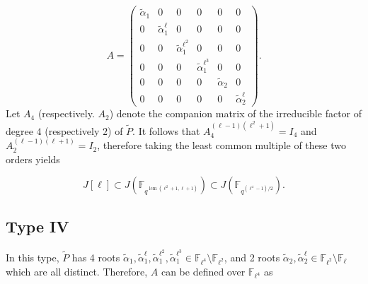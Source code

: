 \documentclass[11pt,a4paper]{article}
\theoremstyle{plain}
\theoremstyle{definition}
\theoremstyle{remark}
\DeclareMathOperator{\lcm}{lcm}
\begin{document}
\[
A =
\begin{pmatrix}
\tilde{\alpha}_1 & 0 & 0 & 0 & 0 & 0\\
0 & \tilde{\alpha}_1^\ell & 0 & 0 & 0 & 0\\
0 & 0 & \tilde{\alpha}_1^{\ell^2} & 0 & 0 & 0\\
0 & 0 & 0 & \tilde{\alpha}_1^{\ell^3} & 0 & 0\\
0 & 0 & 0 & 0 & \tilde{\alpha}_2 & 0\\
0 & 0 & 0 & 0 & 0 & \tilde{\alpha}_2^{\ell}
\end{pmatrix}.
\]
 Let $A_4$ (respectively. $A_2$) denote the companion matrix of the irreducible factor
of degree $4$ (respectively $2$) of \(\tilde P\).
It follows that \(A_4^{(\ell - 1)(\ell^2 + 1)} = I_4\) and \(A_2^{(\ell - 1)(\ell + 1)} = I_2\),  therefore taking the least common multiple of these two orders yields

\[
J[\ell] \subset J(\mathbb{F}_{q^{\lcm(\ell^2+1,\ell+1)}}) \subset J(\mathbb{F}_{q^{(\ell^4-1)/2}}) .
\]

\subsection*{Type IV}
In this type, \(\tilde{P}\) has 4 roots 
\(\tilde{\alpha}_1, \tilde{\alpha}_1^\ell, \tilde{\alpha}_1^{\ell^2},\tilde{\alpha}_1^{\ell^3} \in \mathbb{F}_{\ell^4} \setminus \mathbb{F}_{\ell^2}\), and 2 roots $\tilde{\alpha}_2, \tilde{\alpha}_2^\ell \in \mathbb{F}_{\ell^2} \setminus \mathbb{F}_{\ell}$ 
which are all distinct.  
Therefore, \(A\) can be defined over \(\mathbb{F}_{\ell^4}\) as
\end{document}
